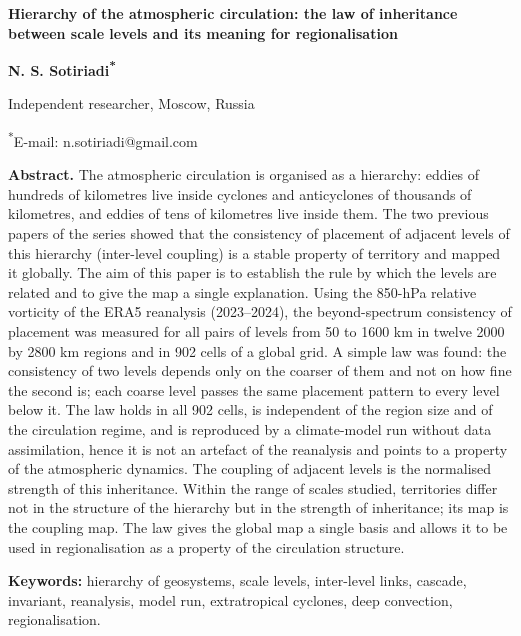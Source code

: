 \documentclass[12pt,a4paper]{article}
\begin{document}
\clearpage
\begin{singlespace}
\noindent\textbf{Hierarchy of the atmospheric circulation: the law of inheritance between scale levels and its meaning for regionalisation}

\medskip
\noindent\textbf{N. S. Sotiriadi\textsuperscript{*}}

\noindent Independent researcher, Moscow, Russia

\noindent\textsuperscript{*}E-mail: n.sotiriadi@gmail.com

\medskip
\noindent\textbf{Abstract.} The atmospheric circulation is organised as a hierarchy: eddies of hundreds of kilometres live inside cyclones and anticyclones of thousands of kilometres, and eddies of tens of kilometres live inside them. The two previous papers of the series showed that the consistency of placement of adjacent levels of this hierarchy (inter-level coupling) is a stable property of territory and mapped it globally. The aim of this paper is to establish the rule by which the levels are related and to give the map a single explanation. Using the 850-hPa relative vorticity of the ERA5 reanalysis (2023--2024), the beyond-spectrum consistency of placement was measured for all pairs of levels from 50 to 1600 km in twelve 2000 by 2800 km regions and in 902 cells of a global grid. A simple law was found: the consistency of two levels depends only on the coarser of them and not on how fine the second is; each coarse level passes the same placement pattern to every level below it. The law holds in all 902 cells, is independent of the region size and of the circulation regime, and is reproduced by a climate-model run without data assimilation, hence it is not an artefact of the reanalysis and points to a property of the atmospheric dynamics. The coupling of adjacent levels is the normalised strength of this inheritance. Within the range of scales studied, territories differ not in the structure of the hierarchy but in the strength of inheritance; its map is the coupling map. The law gives the global map a single basis and allows it to be used in regionalisation as a property of the circulation structure.

\medskip
\noindent\textbf{Keywords:} hierarchy of geosystems, scale levels, inter-level links, cascade, invariant, reanalysis, model run, extratropical cyclones, deep convection, regionalisation.
\end{singlespace}
\end{document}
